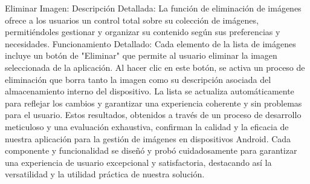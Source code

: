 \documentclass[conference]{IEEEtran}
\begin{document}
Eliminar Imagen:
Descripción Detallada: La función de eliminación de imágenes ofrece a los usuarios un control total sobre su colección de imágenes, permitiéndoles gestionar y organizar su contenido según sus preferencias y necesidades.
Funcionamiento Detallado: Cada elemento de la lista de imágenes incluye un botón de "Eliminar" que permite al usuario eliminar la imagen seleccionada de la aplicación. Al hacer clic en este botón, se activa un proceso de eliminación que borra tanto la imagen como su descripción asociada del almacenamiento interno del dispositivo. La lista se actualiza automáticamente para reflejar los cambios y garantizar una experiencia coherente y sin problemas para el usuario.
Estos resultados, obtenidos a través de un proceso de desarrollo meticuloso y una evaluación exhaustiva, confirman la calidad y la eficacia de nuestra aplicación para la gestión de imágenes en dispositivos Android. Cada componente y funcionalidad se diseñó y probó cuidadosamente para garantizar una experiencia de usuario excepcional y satisfactoria, destacando así la versatilidad y la utilidad práctica de nuestra solución.
\end{document}
